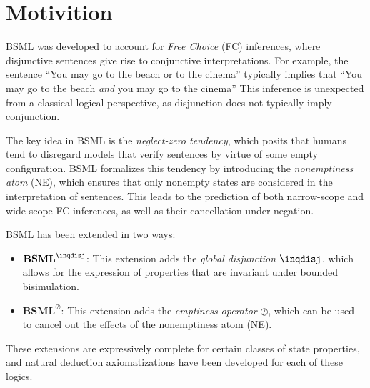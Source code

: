 \section{Motivition}\label{Motivition}

BSML was developed to account for \textit{Free Choice} (FC) inferences, 
where disjunctive sentences give rise to conjunctive interpretations. 
For example, the sentence ``You may go to the beach or to the cinema'' typically implies 
that ``You may go to the beach \textit{and} you may go to the cinema'' 
This inference is unexpected from a classical logical perspective, 
as disjunction does not typically imply conjunction.

The key idea in BSML is the \textit{neglect-zero tendency}, 
which posits that humans tend to disregard models that verify sentences by virtue of some empty configuration. 
BSML formalizes this tendency by introducing the \textit{nonemptiness atom} (NE), which ensures that only nonempty states are considered in the interpretation of sentences. 
This leads to the prediction of both narrow-scope and wide-scope FC inferences, as well as their cancellation under negation.

BSML has been extended in two ways:
\begin{itemize}
    \item \(\textbf{BSML}^{\inqdisj}\): This extension adds the \textit{global disjunction} \(\inqdisj\), which allows for the expression of properties that are invariant under bounded bisimulation.
    \item \(\textbf{BSML}^{\oslash}\): This extension adds the \textit{emptiness operator} \(\oslash\), which can be used to cancel out the effects of the nonemptiness atom (NE).
\end{itemize}

These extensions are expressively complete for certain classes of state properties, and natural deduction axiomatizations have been developed for each of these logics.

